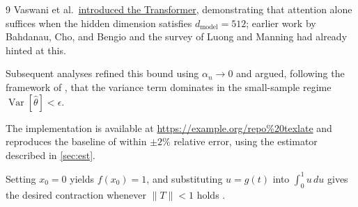 \documentclass[11pt]{article}
\begin{document}
\begin{thebibliography}{9}
 Vaswani et al.\ \href{https://arxiv.org/abs/1706.03762}{introduced the Transformer}, demonstrating that attention alone suffices when the hidden dimension satisfies $d_{\mathrm{model}} = 512$; earlier work by Bahdanau, Cho, and Bengio \cite{bahdanau14} and the survey of Luong and Manning \cite{luong15} had already hinted at this.
\end{thebibliography}

Subsequent analyses \cite{smith20,jones21} refined this bound using $\alpha_n \to 0$ and argued, following the framework of \cite{lee19}, that the variance term dominates in the small-sample regime $\operatorname{Var}[\hat\theta] < \epsilon$.

The implementation is available at \url{https://example.org/repo%20texlate} and reproduces the baseline of \cite{wncfht24} within $\pm 2\%$ relative error, using the estimator described in \ref{sec:est}.

Setting $x_0 = 0$ yields $f(x_0) = 1$, and substituting $u = g(t)$ into $\int_0^1 u\,du$ gives the desired contraction whenever $\|T\| < 1$ holds \cite{banach}.
\end{document}
